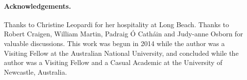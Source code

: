\documentclass[12pt,a4paper]{article}
\begin{document}
\paragraph*{Acknowledgements.}

Thanks to Christine Leopardi for her hospitality at Long Beach.
Thanks to Robert Craigen, William Martin,
Padraig {\'O} Cath{\'a}in and Judy-anne Osborn for valuable discussions.
This work was begun in 2014 while the author was a Visiting Fellow at the Australian National University, 
and concluded while the author was a Visiting Fellow and a Casual Academic at the University of Newcastle, Australia.




%

%


\end{document}
